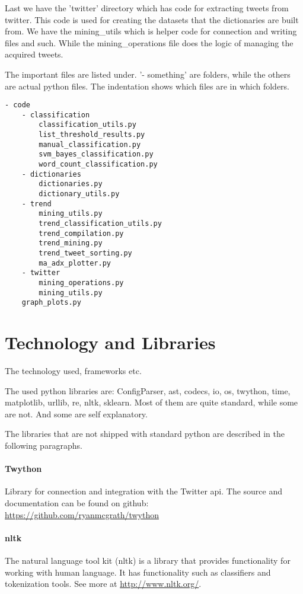 Last we have the 'twitter' directory which has code for extracting tweets from
twitter. This code is used for creating the datasets that the dictionaries are
built from. We have the mining\_utils which is helper code for connection and
writing files and such. While the mining\_operations file does the logic of
managing the acquired tweets. 

The important files are listed under. '- something' are folders, while the
others are actual python files. The indentation shows which files are in which
folders.  
\begin{verbatim}
- code    
    - classification
        classification_utils.py
		list_threshold_results.py
        manual_classification.py
        svm_bayes_classification.py
        word_count_classification.py
    - dictionaries
        dictionaries.py
        dictionary_utils.py
    - trend    
        mining_utils.py
        trend_classification_utils.py
        trend_compilation.py
        trend_mining.py
        trend_tweet_sorting.py
        ma_adx_plotter.py  
    - twitter
        mining_operations.py
        mining_utils.py
    graph_plots.py
\end{verbatim}

\section{Technology and Libraries}\label{code:technology_libraries}
The technology used, frameworks etc.

The used python libraries are: ConfigParser, ast, codecs, io, os, twython,
time, matplotlib, urllib, re, nltk, sklearn.
Most of them are quite standard, while some are not. And some are self
explanatory. 

The libraries that are not shipped with standard python are described in the
following paragraphs. 

\paragraph{Twython}
Library for connection and integration with the Twitter api. 
The source and documentation can be found on github:
\url{https://github.com/ryanmcgrath/twython}

\paragraph{nltk}
The natural language tool kit (nltk) is a library that provides functionality
for working with human language. It has functionality such as classifiers and
tokenization tools. See more at \url{http://www.nltk.org/}.

